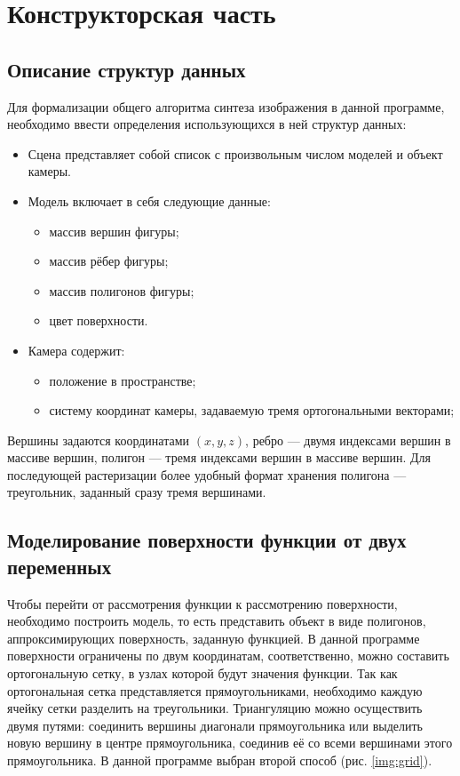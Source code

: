 \chapter{Конструкторская часть}

\section{Описание структур данных}

Для формализации общего алгоритма синтеза изображения в данной программе, необходимо ввести определения использующихся в ней структур данных:
\begin{itemize}
	\item Сцена представляет собой список с произвольным числом моделей и объект камеры.
	\item Модель включает в себя следующие данные: \begin{itemize}
		\item массив вершин фигуры;
		\item массив рёбер фигуры;
		\item массив полигонов фигуры;
		\item цвет поверхности.
	\end{itemize}
	\item Камера содержит: \begin{itemize}
		\item положение в пространстве;
		\item систему координат камеры, задаваемую тремя ортогональными векторами;
	\end{itemize}
\end{itemize}

Вершины задаются координатами $(x, y, z)$, ребро — двумя индексами вершин в массиве вершин, полигон — тремя индексами вершин в массиве вершин.
Для последующей растеризации более удобный формат хранения полигона — треугольник, заданный сразу тремя вершинами.

\section{Моделирование поверхности функции от двух переменных}

Чтобы перейти от рассмотрения функции к рассмотрению поверхности, необходимо построить модель, то есть представить объект в виде полигонов, аппроксимирующих поверхность, заданную функцией.
В данной программе поверхности ограничены по двум координатам, соответственно, можно составить ортогональную сетку, в узлах которой будут значения функции.
Так как ортогональная сетка представляется прямоугольниками, необходимо каждую ячейку сетки разделить на треугольники.
Триангуляцию можно осуществить двумя путями: соединить вершины диагонали прямоугольника или выделить новую вершину в центре прямоугольника, соединив её со всеми вершинами этого прямоугольника.
В данной программе выбран второй способ (рис. \ref{img:grid}).

